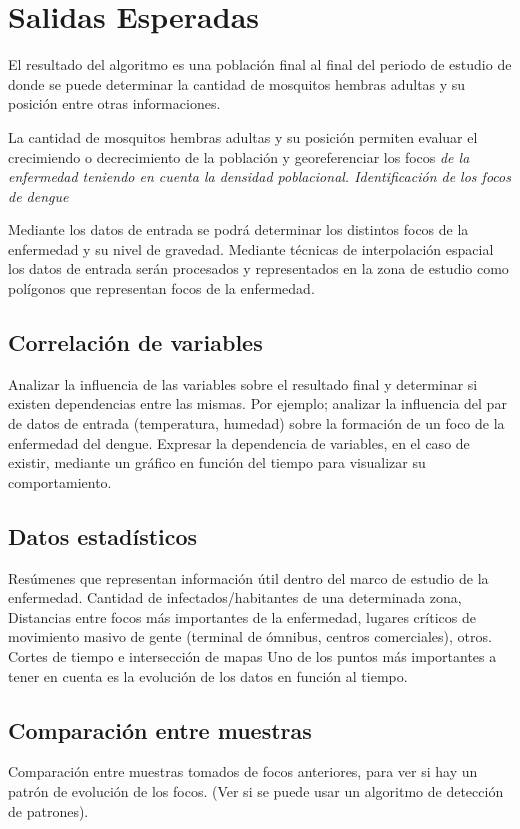 \section{Salidas Esperadas}
\label{sec:solucion-salidas}

El resultado del algoritmo es una población final al final del periodo de estudio
de donde se puede determinar la cantidad de mosquitos hembras adultas y su posición entre otras informaciones.

La cantidad de mosquitos hembras adultas y su posición permiten evaluar el crecimiendo o decrecimiento de la población y georeferenciar los focos \textit{de la enfermedad teniendo en cuenta la densidad poblacional.
Identificación de los focos de dengue}

Mediante los datos de entrada se podrá determinar los distintos focos de la enfermedad y su nivel de gravedad. Mediante técnicas de interpolación espacial los datos de entrada serán procesados y representados en la zona de estudio como polígonos que representan focos de la enfermedad.

\subsection{Correlación de variables}
Analizar la influencia de las variables sobre el resultado final y determinar si existen dependencias entre las mismas. Por ejemplo; analizar la influencia del par de datos de entrada (temperatura, humedad) sobre la formación de un foco de la enfermedad del dengue. Expresar la dependencia de variables, en el caso de existir, mediante un gráfico en función del tiempo para visualizar su comportamiento.

\subsection{Datos estadísticos}
Resúmenes que representan información útil dentro del marco de estudio de la enfermedad. Cantidad de infectados/habitantes de una determinada zona, Distancias entre focos más importantes de la enfermedad, lugares críticos de movimiento masivo de gente (terminal de ómnibus, centros comerciales), otros.
Cortes de tiempo e intersección de mapas
Uno de los puntos más importantes a tener en  cuenta es la evolución de los datos en función al tiempo.

\subsection{Comparación entre muestras}
Comparación entre muestras tomados de focos anteriores, para ver si hay un patrón de evolución de los focos. (Ver si se puede usar un algoritmo de detección de patrones).

